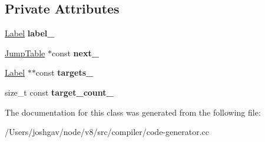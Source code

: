 \subsection*{Private Attributes}
\begin{DoxyCompactItemize}
\item 
\hyperlink{classv8_1_1internal_1_1_label}{Label} {\bfseries label\+\_\+}\hypertarget{classv8_1_1internal_1_1compiler_1_1_code_generator_1_1_jump_table_a51f951a8f1d7b56b9cac8448cdc378ca}{}\label{classv8_1_1internal_1_1compiler_1_1_code_generator_1_1_jump_table_a51f951a8f1d7b56b9cac8448cdc378ca}

\item 
\hyperlink{classv8_1_1internal_1_1compiler_1_1_code_generator_1_1_jump_table}{Jump\+Table} $\ast$const {\bfseries next\+\_\+}\hypertarget{classv8_1_1internal_1_1compiler_1_1_code_generator_1_1_jump_table_adeab8d4a5152272e58b6dad5b6e1a353}{}\label{classv8_1_1internal_1_1compiler_1_1_code_generator_1_1_jump_table_adeab8d4a5152272e58b6dad5b6e1a353}

\item 
\hyperlink{classv8_1_1internal_1_1_label}{Label} $\ast$$\ast$const {\bfseries targets\+\_\+}\hypertarget{classv8_1_1internal_1_1compiler_1_1_code_generator_1_1_jump_table_aefb3603e6ae47f00dce35a531d37667c}{}\label{classv8_1_1internal_1_1compiler_1_1_code_generator_1_1_jump_table_aefb3603e6ae47f00dce35a531d37667c}

\item 
size\+\_\+t const {\bfseries target\+\_\+count\+\_\+}\hypertarget{classv8_1_1internal_1_1compiler_1_1_code_generator_1_1_jump_table_a9384f1385099fb880501518f54ee3db1}{}\label{classv8_1_1internal_1_1compiler_1_1_code_generator_1_1_jump_table_a9384f1385099fb880501518f54ee3db1}

\end{DoxyCompactItemize}


The documentation for this class was generated from the following file\+:\begin{DoxyCompactItemize}
\item 
/\+Users/joshgav/node/v8/src/compiler/code-\/generator.\+cc\end{DoxyCompactItemize}

